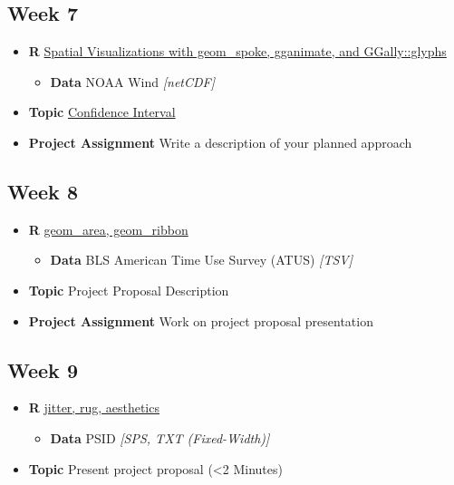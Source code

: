 \documentclass[]{book}
\providecommand{\tightlist}{%
  \setlength{\itemsep}{0pt}\setlength{\parskip}{0pt}}
\theoremstyle{definition}
\theoremstyle{definition}
\theoremstyle{remark}
\begin{document}
\subsection*{Week 7}\label{week-7}

\begin{itemize}
\tightlist
\item
  \textbf{R} \protect\hyperlink{geom_spoke}{Spatial Visualizations with
  geom\_spoke, gganimate, and GGally::glyphs}

  \begin{itemize}
  \tightlist
  \item
    \textbf{Data} NOAA Wind \emph{{[}netCDF{]}}
  \end{itemize}
\item
  \textbf{Topic} \protect\hyperlink{confidence-intervals}{Confidence
  Interval}
\item
  \textbf{Project Assignment} Write a description of your planned
  approach
\end{itemize}

\subsection*{Week 8}\label{week-8}

\begin{itemize}
\tightlist
\item
  \textbf{R} \protect\hyperlink{area-and-ribbons}{geom\_area,
  geom\_ribbon}

  \begin{itemize}
  \tightlist
  \item
    \textbf{Data} BLS American Time Use Survey (ATUS) \emph{{[}TSV{]}}
  \end{itemize}
\item
  \textbf{Topic} Project Proposal Description
\item
  \textbf{Project Assignment} Work on project proposal presentation
\end{itemize}

\subsection*{Week 9}\label{week-9}

\begin{itemize}
\tightlist
\item
  \textbf{R} \protect\hyperlink{jitter-rug}{jitter, rug, aesthetics}

  \begin{itemize}
  \tightlist
  \item
    \textbf{Data} PSID \emph{{[}SPS, TXT (Fixed-Width){]}}
  \end{itemize}
\item
  \textbf{Topic} Present project proposal (\textless{}2 Minutes)
\end{itemize}
\end{document}
